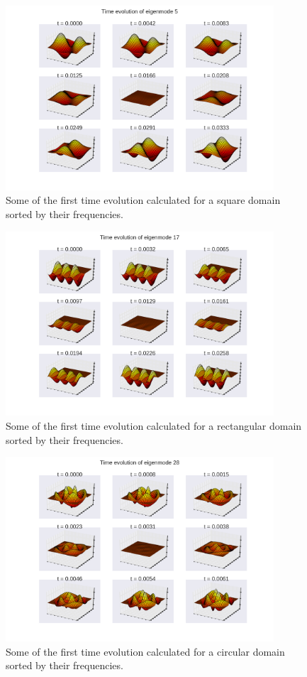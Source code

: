 \documentclass[a4paper]{article}
\begin{document}
\begin{figure}
\centering
\includegraphics[width=10cm]{Pictures/time_evolution_s.png}
\caption{Some of the first time evolution calculated for a square domain sorted by their frequencies.}
\label{fig:time_evolution_s}
\end{figure}

\begin{figure}
\centering
\includegraphics[width=10cm]{Pictures/time_evolution_r.png}
\caption{Some of the first time evolution calculated for a rectangular domain sorted by their frequencies.}
\label{fig:time_evolution_r}
\end{figure}

\begin{figure}
\centering
\includegraphics[width=10cm]{Pictures/time_evolution_c.png}
\caption{Some of the first time evolution calculated for a circular domain sorted by their frequencies.}
\label{fig:time_evolution_c}
\end{figure}
\end{document}
